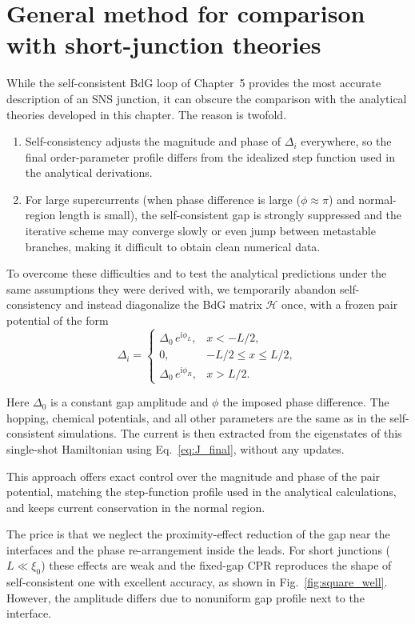 \documentclass[11pt,a4paper,twoside,openany]{report}
\begin{document}
\section{General method for comparison with short-junction theories}
\label{sec:square_well_method}
While the self-consistent BdG loop of Chapter~5 provides the most accurate description of an SNS junction, it can obscure the comparison with the analytical theories developed in this chapter.  The reason is twofold.
\begin{enumerate}
  \item Self-consistency adjusts the magnitude and phase of $\Delta_i$ everywhere, so the final order-parameter profile differs from the idealized step function used in the analytical derivations.
  \item For large supercurrents (when phase difference is large ($\phi\approx\pi$) and normal-region length is small), the self-consistent gap is strongly suppressed and the iterative scheme may converge slowly or even jump between metastable branches, making it difficult to obtain clean numerical data.
\end{enumerate}
To overcome these difficulties and to test the analytical predictions under the same assumptions they were derived with, we temporarily abandon self-consistency and instead diagonalize the BdG matrix $\mathcal{H}$ once, with a frozen pair potential of the form
\begin{equation}
  \Delta_i = \begin{cases}
    \Delta_0\,e^{\mathrm{i}\phi_L}, & x< -L/2,\\[4pt]
    0,                     & -L/2\le x\le L/2 ,\\[4pt]
    \Delta_0\,e^{\mathrm{i}\phi_R}, & x > L/2.
  \end{cases}
  \label{eq:Delta_square}
\end{equation}

Here $\Delta_0$ is a constant gap amplitude and $\phi$ the imposed phase difference.  The hopping, chemical potentials, and all other parameters are the same as in the self-consistent simulations.  The current is then extracted from the eigenstates of this single-shot Hamiltonian using Eq.~\eqref{eq:J_final}, without any updates.

This approach offers exact control over the magnitude and phase of the pair potential, matching the step-function profile used in the analytical calculations, and keeps current conservation in the normal region.

The price is that we neglect the proximity-effect reduction of the gap near the interfaces and the phase re-arrangement inside the leads.  For short junctions ($L\ll\xi_0$) these effects are weak and the fixed-gap CPR reproduces the shape of self-consistent one with excellent accuracy, as shown in Fig.~\ref{fig:square_well}.
However, the amplitude differs due to nonuniform gap profile next to the interface.
\end{document}
